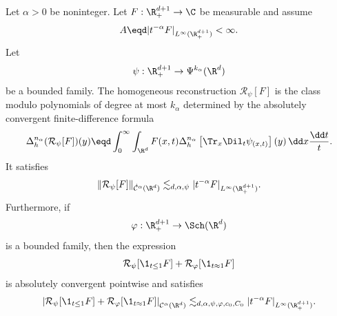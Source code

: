 \begin{proposition}
  \label{prop:holder-reconstruction}Let $\alpha > 0$ be noninteger. Let $F :
  \R^{d + 1}_+ \to \C$ be measurable and assume
  \begin{equation}
    \label{eq:holder-reconstruction-size-assumption} A \eqd | t^{- \alpha} F
    |_{L^{\infty} (\R^{d + 1}_+)} < \infty .
  \end{equation}
  Let
  \[ \psi : \R^{d + 1}_+ \to \Psi^{k_{\alpha}} (\R^d) \]
  be a bounded family. The homogeneous reconstruction $\mathcal{R}_{\psi} [F]$
  is the class modulo polynomials of degree at most $k_{\alpha}$ determined by
  the absolutely convergent finite-difference formula
  \begin{equation}
    \label{eq:homogeneous-reconstruction-increment} \Delta_h^{n_{\alpha}}
    (\mathcal{R}_{\psi} [F]) (y) \eqd \int_0^{\infty} \int_{\R^d} F (x, t)
    \Delta_h^{n_{\alpha}} \left[ \Tr_x \Dil_t \psi_{(x, t)} \right] (y)
    \hspace{0.17em} \dd x \frac{\dd t}{t} .
  \end{equation}
  It satisfies
  \begin{equation}
    \label{eq:holder-reconstruction-homogeneous} \|\mathcal{R}_{\psi}
    [F]\|_{\dot{\mathcal{C}}^{\alpha} (\R^d)} \lesssim_{d, \alpha, \psi} |
    t^{- \alpha} F |_{L^{\infty} (\R^{d + 1}_+)} .
  \end{equation}
  Furthermore, if
  \[ \varphi : \R^{d + 1}_+ \to \Sch (\R^d) \]
  is a bounded family, then the expression
  \[ \mathcal{R}_{\psi} [\1_{t \le 1} F] +\mathcal{R}_{\varphi} [\1_{t \approx
     1} F] \]
  is absolutely convergent pointwise and satisfies
  \begin{equation}
    \label{eq:holder-reconstruction-nonhomogeneous} \left| \mathcal{R}_{\psi}
    [\1_{t \le 1} F] +\mathcal{R}_{\varphi} [\1_{t \approx 1} F]
    \right|_{\mathcal{C}^{\alpha} (\R^d)} \lesssim_{d, \alpha, \psi, \varphi,
    c_0, C_0} | t^{- \alpha} F |_{L^{\infty} (\R^{d + 1}_+)} .
  \end{equation}
\end{proposition}

{} {}

